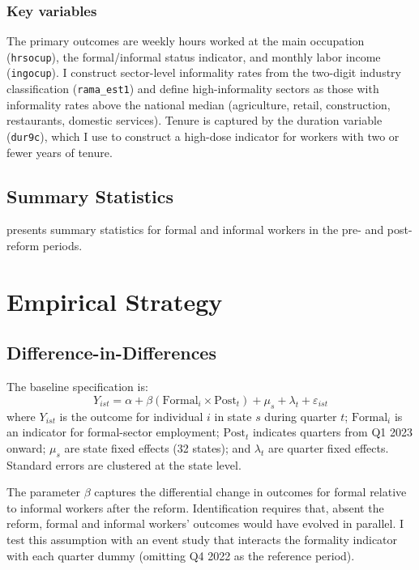 \documentclass[12pt]{article}
\begin{document}
\subsubsection*{Key variables} The primary outcomes are weekly hours worked at the main occupation (\texttt{hrsocup}), the formal/informal status indicator, and monthly labor income (\texttt{ingocup}). I construct sector-level informality rates from the two-digit industry classification (\texttt{rama\_est1}) and define high-informality sectors as those with informality rates above the national median (agriculture, retail, construction, restaurants, domestic services). Tenure is captured by the duration variable (\texttt{dur9c}), which I use to construct a high-dose indicator for workers with two or fewer years of tenure.

\subsection{Summary Statistics}

 presents summary statistics for formal and informal workers in the pre- and post-reform periods.




\section{Empirical Strategy}

\subsection{Difference-in-Differences}

The baseline specification is:
\begin{equation}
Y_{ist} = \alpha + \beta (\text{Formal}_i \times \text{Post}_t) + \mu_s + \lambda_t + \varepsilon_{ist}
\label{eq:did}
\end{equation}
where $Y_{ist}$ is the outcome for individual $i$ in state $s$ during quarter $t$; $\text{Formal}_i$ is an indicator for formal-sector employment; $\text{Post}_t$ indicates quarters from Q1 2023 onward; $\mu_s$ are state fixed effects (32 states); and $\lambda_t$ are quarter fixed effects. Standard errors are clustered at the state level.

The parameter $\beta$ captures the differential change in outcomes for formal relative to informal workers after the reform. Identification requires that, absent the reform, formal and informal workers' outcomes would have evolved in parallel. I test this assumption with an event study that interacts the formality indicator with each quarter dummy (omitting Q4 2022 as the reference period).
\end{document}
